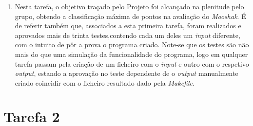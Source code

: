\documentclass[12pt, a4paper]{article}
\begin{document}
\begin{enumerate}
\begin{enumerate} [i.]
\end{enumerate}
    
    \item Nesta tarefa, o objetivo traçado pelo Projeto foi alcançado na plenitude pelo grupo, obtendo a classificação máxima de pontos na avaliação do \textit{Mooshak}. É de referir também que, associados a esta primeira tarefa, foram realizados e aprovados mais de trinta testes,contendo cada um deles um \textit{input} diferente, com o intuito de pôr a prova o programa criado. Note-se que os testes são não mais do que uma simulação da funcionalidade do programa, logo em qualquer tarefa passam pela criação de um ficheiro com o \textit{input} e outro com o respetivo \textit{output}, estando a aprovação no teste dependente de o \textit{output} manualmente criado coincidir com o ficheiro resultado dado pela \textit{Makefile}. 
\end{enumerate}  

\section{Tarefa 2}
\end{document}
